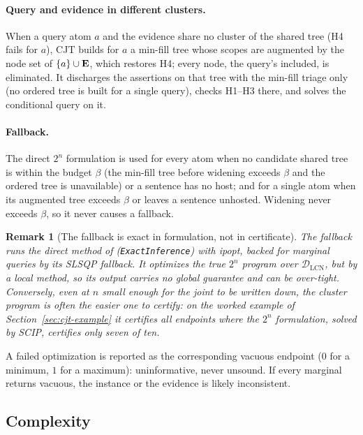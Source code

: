 \documentclass{article} %
\newtheorem{remark}{Remark}
\newcommand{\DLCN}{\mathcal{D}_{\mathrm{LCN}}}
\begin{document}
\paragraph{Query and evidence in different clusters.}
When a query atom $a$ and the evidence share no cluster of the shared tree (H4
fails for $a$), CJT builds for $a$ a min-fill tree whose scopes are augmented by
the node set of $\{a\}\cup\mathbf{E}$, which restores H4; every node, the query's
included, is eliminated. It discharges the assertions on that tree with the
min-fill triage only (no ordered tree is built for a single query), checks H1--H3
there, and solves the conditional query on it.

\paragraph{Fallback.}
The direct $2^n$ formulation is used for every atom when no candidate shared tree
is within the budget $\beta$ (the min-fill tree before widening exceeds $\beta$ and
the ordered tree is unavailable) or a sentence has no host; and for a single atom
when its augmented tree exceeds $\beta$ or leaves a sentence unhosted. Widening
never exceeds $\beta$, so it never causes a fallback.

\begin{remark}[The fallback is exact in formulation, not in certificate]\label{rem:oracle}
The fallback runs the direct method of \citet{marinescu2022neurips}
(\texttt{ExactInference}) with ipopt, backed for marginal queries by its SLSQP
fallback. It optimizes the true $2^n$ program over $\DLCN$, but by a local method,
so its output carries no global guarantee and can be over-tight. Conversely,
even at $n$ small enough for the joint to be written down, the cluster program is
often the easier one to certify: on the worked example of
Section~\ref{sec:cjt-example} it certifies all endpoints where the $2^n$
formulation, solved by SCIP, certifies only seven of ten.
\end{remark}

A failed optimization is reported as the corresponding vacuous endpoint ($0$ for a
minimum, $1$ for a maximum): uninformative, never unsound. If every marginal
returns vacuous, the instance or the evidence is likely inconsistent.

\subsection{Complexity}\label{sec:algo-complexity}
\end{document}
